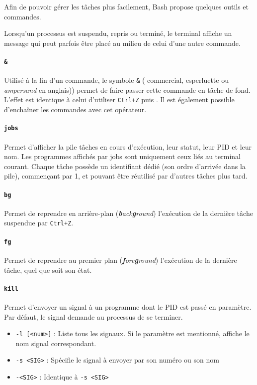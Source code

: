 Afin de pouvoir gérer les tâches plus facilement, Bash propose quelques outils et commandes. 

 Lorsqu'un processus est suspendu, repris ou terminé, le terminal affiche un message qui peut parfois être placé au milieu de celui d'une autre commande.

\paragraph{\texttt{\&}} 
Utilisé à la fin d'un commande, le symbole \texttt{\&} ( commercial, esperluette ou \textit{ampersand} en anglais)) permet de faire passer cette commande en tâche de fond. L'effet est identique à celui d'utiliser \texttt{Ctrl+Z} puis . Il est également possible d'enchaîner les commandes avec cet opérateur.


\paragraph{\texttt{jobs}} 
Permet d'afficher la pile tâches en cours d'exécution,  leur statut, leur PID et leur nom. Les programmes affichés par jobs sont uniquement ceux liés au terminal courant. Chaque tâche possède un identifiant dédié (son ordre d'arrivée dans la pile), commençant par 1, et pouvant être réutilisé par d'autres tâches plus tard.

\paragraph{\texttt{bg}} 
Permet de reprendre en arrière-plan (\textit{\textbf{b}ack\textbf{g}round}) l'exécution de la dernière tâche suspendue par \texttt{Ctrl+Z}.

\paragraph{\texttt{fg}} 
Permet de reprendre au premier plan (\textit{\textbf{f}ore\textbf{g}round}) l'exécution de la dernière tâche, quel que soit son état.



\paragraph{\texttt{kill}} 
Permet d'envoyer un signal à un programme dont le PID est passé en paramètre. Par défaut, le signal demande au processus de se terminer.
\begin{itemize}
    \item \texttt{-l [<num>]} : Liste tous les signaux. Si le paramètre est mentionné, affiche le nom signal correspondant.
    \item \texttt{-s <SIG>} : Spécifie le signal à envoyer par son numéro ou son nom
    \item \texttt{-<SIG>} : Identique à \texttt{-s <SIG>}
\end{itemize}

